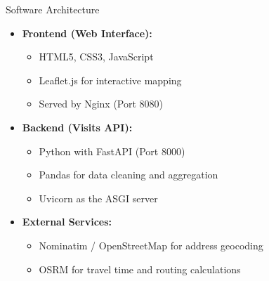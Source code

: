 \begin{frame}{Software Architecture}
\begin{itemize}
    \item \textbf{Frontend (Web Interface):}
        \begin{itemize}
            \item HTML5, CSS3, JavaScript
            \item Leaflet.js for interactive mapping
            \item Served by Nginx (Port 8080)
        \end{itemize}
    \item \textbf{Backend (Visits API):}
        \begin{itemize}
            \item Python with FastAPI (Port 8000)
            \item Pandas for data cleaning and aggregation
            \item Uvicorn as the ASGI server
        \end{itemize}
    \item \textbf{External Services:}
        \begin{itemize}
            \item Nominatim / OpenStreetMap for address geocoding
            \item OSRM for travel time and routing calculations
        \end{itemize}
\end{itemize}
\end{frame}
